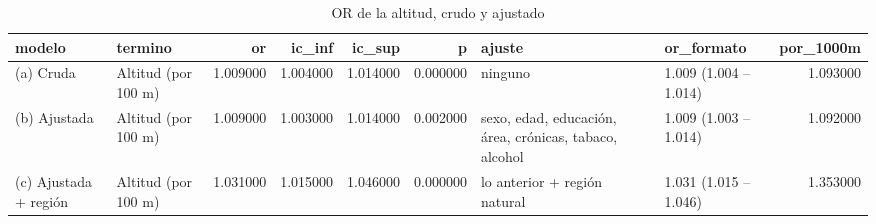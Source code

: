 \begin{table}[htbp]
\caption{OR de la altitud, crudo y ajustado}
\label{tab:tabla_38_altitud_modelos}
\begin{tabular}{llrrrrllr}
\toprule
modelo & termino & or & ic\_inf & ic\_sup & p & ajuste & or\_formato & por\_1000m \\
\midrule
(a) Cruda & Altitud (por 100 m) & 1.009000 & 1.004000 & 1.014000 & 0.000000 & ninguno & 1.009 (1.004 – 1.014) & 1.093000 \\
(b) Ajustada & Altitud (por 100 m) & 1.009000 & 1.003000 & 1.014000 & 0.002000 & sexo, edad, educación, área, crónicas, tabaco, alcohol & 1.009 (1.003 – 1.014) & 1.092000 \\
(c) Ajustada + región & Altitud (por 100 m) & 1.031000 & 1.015000 & 1.046000 & 0.000000 & lo anterior + región natural & 1.031 (1.015 – 1.046) & 1.353000 \\
\bottomrule
\end{tabular}
\end{table}
